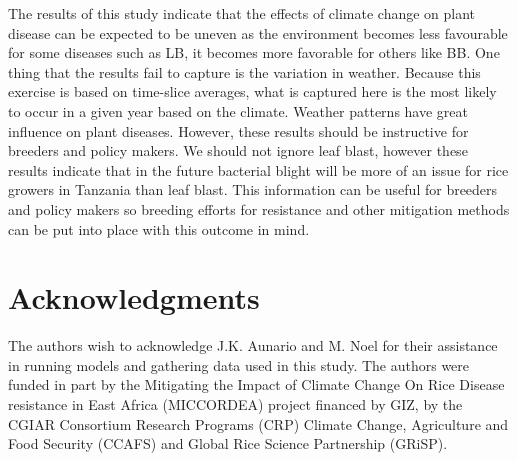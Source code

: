 \documentclass[preprint,review,12pt]{elsarticle}
\begin{document}
    The results of this study indicate that the effects of climate change on plant disease can be expected to be uneven as the environment becomes less favourable for some diseases such as LB, it becomes more favorable for others like BB. One thing that the results fail to capture is the variation in weather. Because this exercise is based on time-slice averages, what is captured here is the most likely to occur in a given year based on the climate. Weather patterns have great influence on plant diseases. However, these results should be instructive for breeders and policy makers. We should not ignore leaf blast, however these results indicate that in the future bacterial blight will be more of an issue for rice growers in Tanzania than leaf blast. This information can be useful for breeders and policy makers so breeding efforts for resistance and other mitigation methods can be put into place with this outcome in mind.
    
    \section{Acknowledgments}
    The authors wish to acknowledge J.K. Aunario and M. Noel for their assistance in running models and gathering data used in this study. The authors were funded in part by the Mitigating the Impact of Climate Change On Rice Disease resistance in East Africa (MICCORDEA) project financed by GIZ, by the CGIAR Consortium Research Programs (CRP) Climate Change, Agriculture and Food Security (CCAFS) and Global Rice Science Partnership (GRiSP).
    
    
    
    
    
    
    
    
    
    
    
    
    
    
    
    
    
\end{document}
